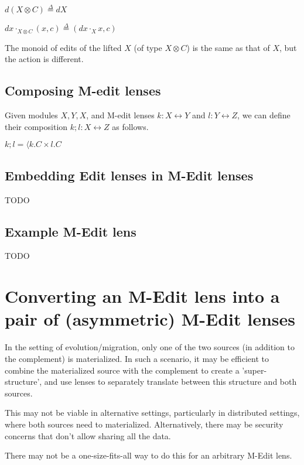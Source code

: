 \documentclass[a4paper,10pt]{article}
\newcommand{\defeq}{\ensuremath{\stackrel{\Delta}{=}}}
\begin{document}
$ d(X \otimes C) \defeq dX$

$ dx \cdot_{X \otimes C} (x,c) \defeq (dx \cdot_X x, c) $

The monoid of edits of the lifted $X$ (of type $X \otimes C$) is the same as that of $X$, but the action is different.

\subsection{Composing M-edit lenses}
Given modules $X, Y, X$, and M-edit lenses $k : X \leftrightarrow Y$ and $l : Y \leftrightarrow Z$, we can define their composition $k;l : X \leftrightarrow Z$ as follows.

$k;l = \langle k.C \times l.C$



\subsection{Embedding Edit lenses in M-Edit lenses}
TODO

\subsection{Example M-Edit lens}
TODO

\section{Converting an M-Edit lens into a pair of (asymmetric) M-Edit lenses}
In the setting of evolution/migration, only one of the two sources (in addition to the complement) is materialized. In such a scenario, it may be efficient to combine the materialized source with the complement to create a 'super-structure', and use lenses to separately translate between this structure and both sources. 

This may not be viable in alternative settings, particularly in distributed settings, where both sources need to materialized. Alternatively, there may be security concerns that don't allow sharing all the data.

There may not be a one-size-fits-all way to do this for an arbitrary M-Edit lens.
\end{document}
